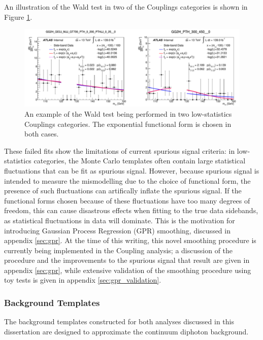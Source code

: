 An illustration of the Wald test in two of the Couplings categories is shown in Figure \ref{fig:WaldTest}.

\begin{figure}
\includegraphics[width=\linewidth]{figures/sigbkgparam/Walds.png}
\caption{An example of the Wald test being performed in two low-statistics Couplings categories. The exponential functional form is chosen in both cases.}
\label{fig:WaldTest}
\end{figure} 

These failed fits show the limitations of current spurious signal criteria: in low-statistics categories, the Monte Carlo templates often contain large statistical fluctuations that can be fit as spurious signal. However, because spurious signal is intended to measure the mismodelling due to the choice of functional form, the presence of such fluctuations can artifically inflate the spurious signal. If the functional forms chosen because of these fluctuations have too many degrees of freedom, this can cause disastrous effects when fitting to the true data sidebands, as statistical fluctuations in data will dominate. This is the motivation for introducing Gaussian Process Regression (GPR) smoothing, discussed in appendix \ref{sec:gpr}. At the time of this writing, this novel smoothing procedure is currently being implemented in the Coupling analysis; a discussion of the procedure and the improvements to the spurious signal that result are given in appendix \ref{sec:gpr}, while extensive validation of the smoothing procedure using toy tests is given in appendix \ref{sec:gpr_validation}.

\subsubsection{Background Templates} \label{sec:bkgtemplates} 

The background templates constructed for both analyses discussed in this dissertation are designed to approximate the continuum diphoton background. 

